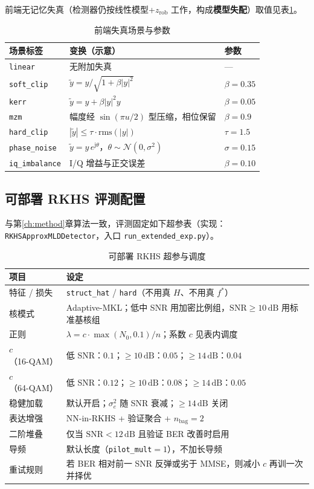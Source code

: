 前端无记忆失真（检测器仍按线性模型+$z_{\mathrm{rob}}$ 工作，构成\textbf{模型失配}）取值见表\ref{tab:nonlin-cfg}。

\begin{table}[H]
\centering
\caption{前端失真场景与参数}
\label{tab:nonlin-cfg}
\begin{tabular}{lll}
\toprule
场景标签 & 变换（示意） & 参数 \\
\midrule
\texttt{linear} & 无附加失真 & --- \\
\texttt{soft\_clip} & $\tilde y=y/\sqrt{1+\beta|y|^2}$ & $\beta=0.35$ \\
\texttt{kerr} & $\tilde y=y+\beta|y|^2 y$ & $\beta=0.05$ \\
\texttt{mzm} & 幅度经 $\sin(\pi u/2)$ 型压缩，相位保留 & $\beta=0.9$ \\
\texttt{hard\_clip} & $|\tilde y|\le \tau\cdot\mathrm{rms}(|y|)$ & $\tau=1.5$ \\
\texttt{phase\_noise} & $\tilde y=y\,e^{\mathrm{j}\theta}$，$\theta\sim\mathcal{N}(0,\sigma^2)$ & $\sigma=0.15$ \\
\texttt{iq\_imbalance} & I/Q 增益与正交误差 & $\beta=0.10$ \\
\bottomrule
\end{tabular}
\end{table}

\subsection{可部署 RKHS 评测配置}

与第\ref{ch:method}章算法一致，评测固定如下超参表（实现：\texttt{RKHSApproxMLDDetector}，入口 \texttt{run\_extended\_exp.py}）。

\begin{table}[H]
\centering
\caption{可部署 RKHS 超参与调度}
\label{tab:rkhs-cfg}
\begin{tabular}{ll}
\toprule
项目 & 设定 \\
\midrule
特征 / 损失 & \texttt{struct\_hat} / \texttt{hard}（不用真 $H$、不用真 $f^*$） \\
核模式 & Adaptive-MKL；低中 SNR 用加密比例组，\mbox{$\mathrm{SNR}\ge 10\,\mathrm{dB}$} 用标准基核组 \\
正则 & $\lambda=c\cdot\max(N_0,0.1)/n$；系数 $c$ 见表内调度 \\
$c$（16-QAM） & 低 SNR：$0.1$；$\ge 10\,\mathrm{dB}$：$0.05$；$\ge 14\,\mathrm{dB}$：$0.04$ \\
$c$（64-QAM） & 低 SNR：$0.12$；$\ge 10\,\mathrm{dB}$：$0.08$；$\ge 14\,\mathrm{dB}$：$0.05$ \\
稳健加载 & 默认开启；$\sigma_e^2$ 随 SNR 衰减；$\ge 14\,\mathrm{dB}$ 关闭 \\
表达增强 & NN-in-RKHS + 验证聚合 + $n_{\mathrm{bag}}=2$ \\
二阶堆叠 & 仅当 $\mathrm{SNR}<12\,\mathrm{dB}$ 且验证 BER 改善时启用 \\
导频 & 默认长度（\texttt{pilot\_mult}$=1$），不加长导频 \\
重试规则 & 若 BER 相对前一 SNR 反弹或劣于 MMSE，则减小 $c$ 再训一次并择优 \\
\bottomrule
\end{tabular}
\end{table}

